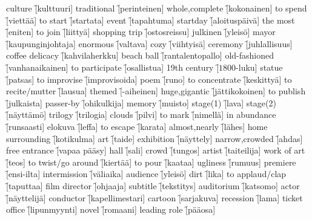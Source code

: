 \begin{questions}
  \begin{multicols}{3}
    \raggedcolumns
    \question culture \f[kulttuuri]
    \question traditional \f[perinteinen]
    \question whole,complete \f[kokonainen]
    \question to spend \f[viettää]
    \question to start \f[startata]
    \question event \f[tapahtuma]
    \question startday \f[aloituspäivä]
    \question the most \f[eniten]
    \question to join \f[liittyä]
    \question shopping trip \f[ostosreissu]
    \question julkinen \f[yleisö]
    \question mayor \f[kaupunginjohtaja]
    \question enormous \f[valtava]
    \question cozy \f[viihtyisä]
    \question ceremony \f[juhlallisuus]
    \question coffee delicacy \f[kahvilaherkku]
    \question beach ball \f[rantalentopallo]
    \question old-fashioned \f[vanhanaikainen]
    \question to participate \f[osallistua]
    \question 19th century \f[$1800$-luku]
    \question statue \f[patsas]
    \question to improvise \f[improvisoida]
    \question poem \f[runo]
    \question to concentrate \f[keskittyä]
    \question to recite/mutter \f[lausua]
    \question themed \f[-aiheinen]
    \question huge,gigantic \f[jättikokoinen]
    \question to publish \f[julkaista]
    \question passer-by \f[ohikulkija]
    \question memory \f[muisto]
    \question stage(1) \f[lava]
    \question stage(2) \f[näyttämö]
    \question trilogy \f[trilogia]
    \question clouds \f[pilvi]
    \question to mark \f[nimellä]
    \question in abundance \f[runsaasti]
    \question elokuva \f[leffa]
    \question to escape \f[karata]
    \question almost,nearly \f[lähes]
    \question home surrounding \f[kotikulma]
    \question art \f[taide]
    \question exhibition \f[näyttely]
    \question narrow,crowded \f[ahdas]
    \question free entrance \f[vapaa pääsy]
    \question hall \f[sali]
    \question crowd \f[tungos]
    \question artist \f[taiteilija]
    \question work of art \f[teos]
    \question to twist/go around \f[kiertää]
    \question to pour \f[kaataa]
    \question ugliness \f[rumuus]
    \question premiere \f[ensi-ilta]
    \question intermission \f[väliaika]
    \question audience \f[yleisö]
    \question dirt \f[lika]
    \question to applaud/clap \f[taputtaa]
    \question film director \f[ohjaaja]
    \question subtitle \f[tekstitys]
    \question auditorium \f[katsomo]
    \question actor \f[näyttelijä]
    \question conductor \f[kapellimestari]
    \question cartoon \f[sarjakuva]
    \question recession \f[lama]
    \question ticket office \f[lipunmyynti]
    \question novel \f[romaani]
    \question leading role \f[pääosa]

\end{multicols}
\end{questions}
